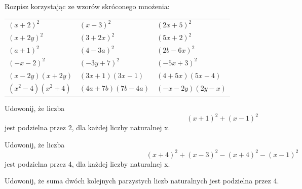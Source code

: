 \documentclass[12pt,a4paper]{article}
\theoremstyle{break}
\begin{document}
	\begin{zad}
		Rozpisz korzystając ze wzorów skróconego mnożenia:
	\end{zad}
	\begin{enumerate}[a)] \begin{tabular}{p{5cm} p{5cm} p{5cm}} 
			\item $(x+2)^2$ & \vspace{0.25cm}\item$(x-3)^2$ &\vspace{0.25cm}\item $(2x+5)^2$\\
			\item $(x+2y)^2$ & \item $(3+2x)^2$ &\item $(5x+2)^2$\\
			\item $(a+1)^2$ & \item $(4-3a)^2$ &\item $(2b-6x)^2$\\
			\item $(-x-2)^2$ & \item $(-3y+7)^2$ &\item $(-5x+3)^2$\\
			\item $(x-2y)(x+2y)$ & \item $(3x+1)(3x-1)$ &\item $(4+5x)(5x-4)$\\
			\item $(x^2-4)(x^2+4)$ & \item $(4a+7b)(7b-4a)$ &\item $(-x-2y)(2y-x)$\\
	\end{tabular} \end{enumerate}

	\begin{zad}
		Udowonij, że liczba
		$$(x+1)^2+(x-1)^2$$
		jest podzielna przez 2, dla każdej liczby naturalnej x.
	\end{zad}

	\begin{zad}
		Udowonij, że liczba
		$$(x+4)^2+(x-3)^2-(x+4)^2-(x-1)^2$$
		jest podzielna przez 4, dla każdej liczby naturalnej x.
	\end{zad}

	\begin{zad}
		Udowonij, że suma dwóch kolejnych parzystych liczb naturalnych jest podzielna przez 4.
	\end{zad}
\end{document}
